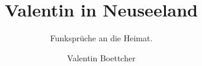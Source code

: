 \documentclass[twoside, a5paper, fontsize=12pt, parskip=half, DIV=14,
headings=onelinechapter, openany]{scrbook}
\title{Valentin in Neuseeland}
\subtitle{Funkspr\"uche an die Heimat.}
\author{Valentin Boettcher}
\begin{document}
\begin{titlepage}
\maketitle
\end{titlepage}
\tableofcontents
\clearpage
\end{document}
